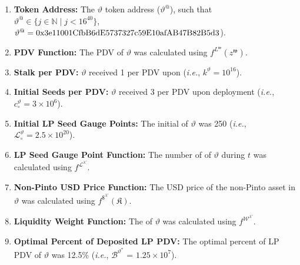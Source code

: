 \documentclass[class=article, crop=false]{standalone}
\begin{document}
\begin{enumerate}

    \item \textbf{Token Address:} The $\vartheta$ token address ($\vartheta^{@}$), such that $\vartheta^{@} \in \{j \in \mathbb{N} \mid j < 16^{40} \}$, $\vartheta^{@} = \\ \text{0x3e11001CfbB6dE5737327c59E10afAB47B82B5d3}$).
    
    \item \textbf{PDV Function:} The PDV of $\vartheta$ was calculated using $f^{L^{\mathfrak{w}}}(z^{\mathfrak{w}})$.
                
    \item \textbf{Stalk per PDV:} $\vartheta$  received 1  per PDV upon  (\textit{i.e.}, $k^{\vartheta} = 10^{16}$).
    
    \item \textbf{Initial Seeds per PDV:} $\vartheta$  received 3  per PDV upon deployment  (\textit{i.e.}, ${c_{\circ}^{\vartheta}} = 3 \times 10^6$).

    \item \textbf{Initial LP Seed Gauge Points:} The initial  of $\vartheta$ was 250 (\textit{i.e.}, $\mathscr{L}_{\circ}^{\vartheta} = 2.5 \times 10^{20}$).
    
    \item \textbf{LP Seed Gauge Point Function:} The number of  of $\vartheta$ during $t$ was calculated using $f^{\mathscr{L}^{\lambda'}}$.

    \item \textbf{Non-Pinto USD Price Function:} The USD price of the non-Pinto asset in $\vartheta$ was calculated using $f^{\$^{\lambda'}}(\mathfrak{K})$.

    \item \textbf{Liquidity Weight Function:} The  of $\vartheta$ was calculated using $f^{\mathscr{W}^{\lambda'}}$.
    
    \item \textbf{Optimal Percent of Deposited LP PDV:} The optimal percent of  LP PDV of $\vartheta$ was 12.5\% (\textit{i.e.}, $\mathscr{B}^{\vartheta^{*}}$ = $1.25 \times 10^{7}$).


\end{enumerate}
\end{document}
